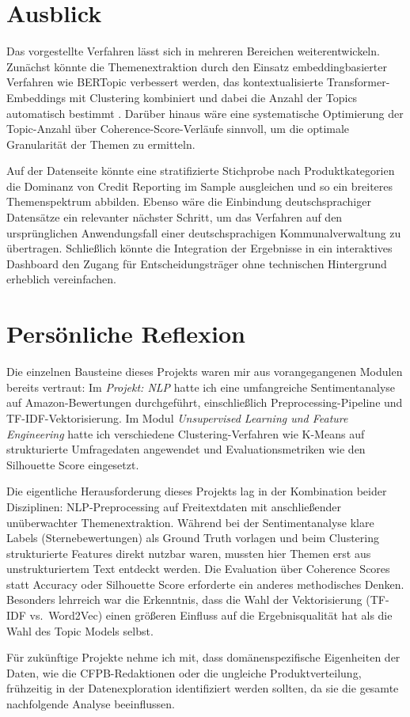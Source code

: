 \documentclass[a4paper,11pt]{article}
\begin{document}
\section{Ausblick}

Das vorgestellte Verfahren lässt sich in mehreren Bereichen weiterentwickeln. Zunächst könnte
die Themenextraktion durch den Einsatz embeddingbasierter Verfahren wie BERTopic verbessert
werden, das kontextualisierte Transformer-Embeddings mit Clustering kombiniert und dabei
die Anzahl der Topics automatisch bestimmt \parencite[S.~13--15]{egger2022topic}. Darüber
hinaus wäre eine systematische Optimierung der Topic-Anzahl über Coherence-Score-Verläufe
sinnvoll, um die optimale Granularität der Themen zu ermitteln.

Auf der Datenseite könnte eine stratifizierte Stichprobe nach Produktkategorien die Dominanz
von Credit Reporting im Sample ausgleichen und so ein breiteres Themenspektrum abbilden.
Ebenso wäre die Einbindung deutschsprachiger Datensätze ein relevanter nächster Schritt, um
das Verfahren auf den ursprünglichen Anwendungsfall einer deutschsprachigen Kommunalverwaltung
zu übertragen. Schließlich könnte die Integration der Ergebnisse in ein interaktives Dashboard
den Zugang für Entscheidungsträger ohne technischen Hintergrund erheblich vereinfachen.

\section{Persönliche Reflexion}

Die einzelnen Bausteine dieses Projekts waren mir aus vorangegangenen Modulen bereits
vertraut: Im \textit{Projekt: NLP} hatte ich eine umfangreiche Sentimentanalyse auf
Amazon-Bewertungen durchgeführt, einschließlich Preprocessing-Pipeline und TF-IDF-Vektorisierung.
Im Modul \textit{Unsupervised Learning und Feature Engineering} hatte ich verschiedene
Clustering-Verfahren wie K-Means auf strukturierte Umfragedaten angewendet und
Evaluationsmetriken wie den Silhouette Score eingesetzt.

Die eigentliche Herausforderung dieses Projekts lag in der Kombination beider
Disziplinen: NLP-Preprocessing auf Freitextdaten mit anschließender unüberwachter
Themenextraktion. Während bei der Sentimentanalyse klare Labels (Sternebewertungen)
als Ground Truth vorlagen und beim Clustering strukturierte Features direkt nutzbar
waren, mussten hier Themen erst aus unstrukturiertem Text entdeckt werden. Die
Evaluation über Coherence Scores statt Accuracy oder Silhouette Score erforderte
ein anderes methodisches Denken. Besonders lehrreich war die Erkenntnis, dass die
Wahl der Vektorisierung (TF-IDF vs.\ Word2Vec) einen größeren Einfluss auf die
Ergebnisqualität hat als die Wahl des Topic Models selbst.

Für zukünftige Projekte nehme ich mit, dass domänenspezifische Eigenheiten der Daten,
wie die CFPB-Redaktionen oder die ungleiche Produktverteilung, frühzeitig in der
Datenexploration identifiziert werden sollten, da sie die gesamte nachfolgende
Analyse beeinflussen.

\newpage
\printbibliography[title=Literaturverzeichnis]
\end{document}
